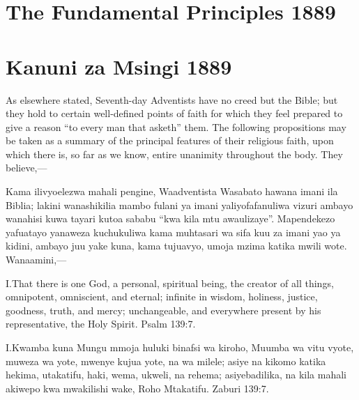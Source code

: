  \label{chap:appendix}


 \label{chap:appendix}






\section*{The Fundamental Principles 1889}


\section*{Kanuni za Msingi 1889}


As elsewhere stated, Seventh-day Adventists have no creed but the Bible; but they hold to certain well-defined points of faith for which they feel prepared to give a reason “to every man that asketh” them. The following propositions may be taken as a summary of the principal features of their religious faith, upon which there is, so far as we know, entire unanimity throughout the body. They believe,—


Kama ilivyoelezwa mahali pengine, Waadventista Wasabato hawana imani ila Biblia; lakini wanashikilia mambo fulani ya imani yaliyofafanuliwa vizuri ambayo wanahisi kuwa tayari kutoa sababu “kwa kila mtu awaulizaye”. Mapendekezo yafuatayo yanaweza kuchukuliwa kama muhtasari wa sifa kuu za imani yao ya kidini, ambayo juu yake kuna, kama tujuavyo, umoja mzima katika mwili wote. Wanaamini,—


\lettrine{I.} That there is one God, a personal, spiritual being, the creator of all things, omnipotent, omniscient, and eternal; infinite in wisdom, holiness, justice, goodness, truth, and mercy; unchangeable, and everywhere present by his representative, the Holy Spirit. Psalm 139:7.


\lettrine{I.} Kwamba kuna Mungu mmoja huluki binafsi wa kiroho, Muumba wa vitu vyote, muweza wa yote, mwenye kujua yote, na wa milele; asiye na kikomo katika hekima, utakatifu, haki, wema, ukweli, na rehema; asiyebadilika, na kila mahali akiwepo kwa mwakilishi wake, Roho Mtakatifu. Zaburi 139:7.


